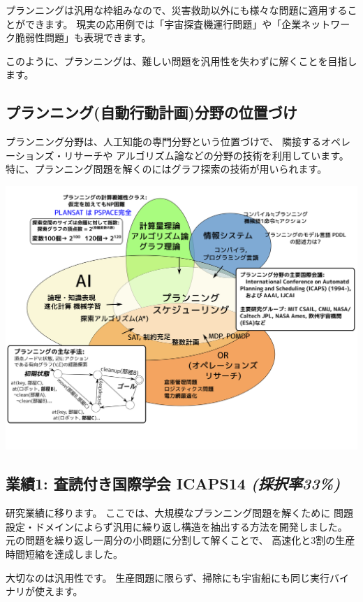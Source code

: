 \begin{resume}
プランニングは汎用な枠組みなので、災害救助以外にも様々な問題に適用することができます。
現実の応用例では「宇宙探査機運行問題」や「企業ネットワーク脆弱性問題」も表現できます。

このように、プランニングは、難しい問題を汎用性を失わずに解くことを目指します。
\end{resume}

\subsection{プランニング(自動行動計画)分野の位置づけ}
\label{sec-1-5}

\begin{resume}
プランニング分野は、人工知能の専門分野という位置づけで、
隣接するオペレーションズ・リサーチや
アルゴリズム論などの分野の技術を利用しています。
特に、プランニング問題を解くのにはグラフ探索の技術が用いられます。
\end{resume}

\includegraphics{img/planning2.png}

\subsection{業績1: 査読付き国際学会 ICAPS14 \textbf{\emph{(採択率33\%)}}}
\label{sec-1-6}

\begin{resume}
研究業績に移ります。
ここでは、大規模なプランニング問題を解くために
問題設定・ドメインによらず汎用に繰り返し構造を抽出する方法を開発しました。
元の問題を繰り返し一周分の小問題に分割して解くことで、
高速化と3割の生産時間短縮を達成しました。

大切なのは汎用性です。
生産問題に限らず、掃除にも宇宙船にも同じ実行バイナリが使えます。
\end{resume}

